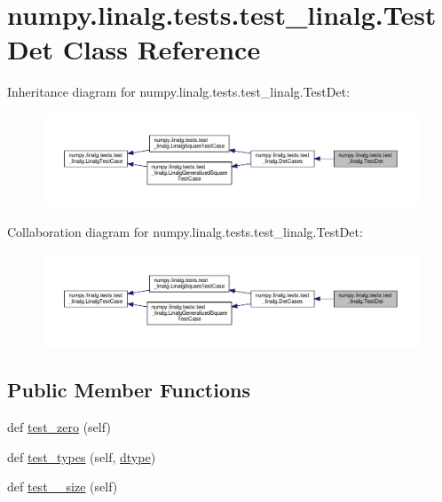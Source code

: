 \hypertarget{classnumpy_1_1linalg_1_1tests_1_1test__linalg_1_1TestDet}{}\section{numpy.\+linalg.\+tests.\+test\+\_\+linalg.\+Test\+Det Class Reference}
\label{classnumpy_1_1linalg_1_1tests_1_1test__linalg_1_1TestDet}


Inheritance diagram for numpy.\+linalg.\+tests.\+test\+\_\+linalg.\+Test\+Det\+:
\nopagebreak
\begin{figure}[H]
\begin{center}
\leavevmode
\includegraphics[width=350pt]{classnumpy_1_1linalg_1_1tests_1_1test__linalg_1_1TestDet__inherit__graph}
\end{center}
\end{figure}


Collaboration diagram for numpy.\+linalg.\+tests.\+test\+\_\+linalg.\+Test\+Det\+:
\nopagebreak
\begin{figure}[H]
\begin{center}
\leavevmode
\includegraphics[width=350pt]{classnumpy_1_1linalg_1_1tests_1_1test__linalg_1_1TestDet__coll__graph}
\end{center}
\end{figure}
\subsection*{Public Member Functions}
\begin{DoxyCompactItemize}
\item 
def \hyperlink{classnumpy_1_1linalg_1_1tests_1_1test__linalg_1_1TestDet_a0c7a3bc8e086fbae236d5da8c0dabc51}{test\+\_\+zero} (self)
\item 
def \hyperlink{classnumpy_1_1linalg_1_1tests_1_1test__linalg_1_1TestDet_a36ad64800b28ee76d11be6f1fc02d611}{test\+\_\+types} (self, \hyperlink{namespacenumpy_1_1linalg_1_1tests_1_1test__linalg_a1063ea74fa35b7244592f8a89b8a71a2}{dtype})
\item 
def \hyperlink{classnumpy_1_1linalg_1_1tests_1_1test__linalg_1_1TestDet_aae7a694f25fd64447d65317438c8d7e5}{test\+\_\+\_\+size} (self)
\end{DoxyCompactItemize}
